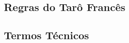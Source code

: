 \documentclass[12pt]{article}
\begin{document}
\subsection{Regras do Tarô Francês}

\subsection{Termos Técnicos}









\end{document}
